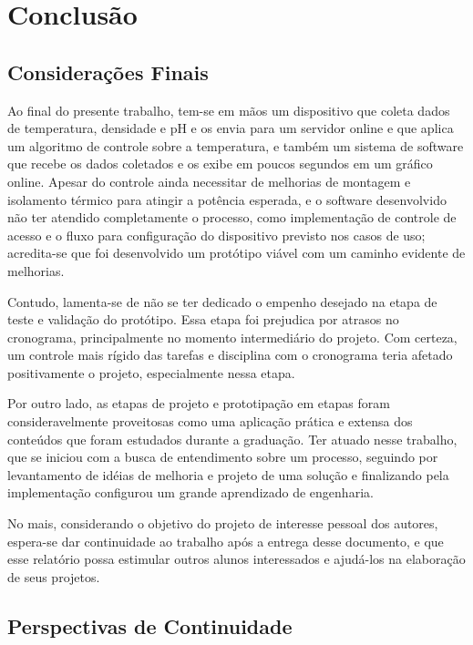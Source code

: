\chapter{Conclusão}

\section{Considerações Finais}

Ao final do presente trabalho, tem-se em mãos um dispositivo que coleta dados de temperatura, densidade e pH e os envia 
para um servidor online e que aplica um algoritmo de controle sobre a temperatura, e também um sistema de software 
que recebe os dados coletados e os exibe em poucos segundos em um gráfico online. 
Apesar do controle ainda necessitar de melhorias de montagem e isolamento térmico para atingir a potência esperada, e o 
software desenvolvido não ter atendido completamente o processo, como implementação de controle de acesso e o fluxo para 
configuração do dispositivo previsto nos casos de uso; acredita-se que foi desenvolvido um protótipo viável com um caminho evidente de melhorias.

Contudo, lamenta-se de não se ter dedicado o empenho desejado na etapa de teste e validação do protótipo. Essa etapa
foi prejudica por atrasos no cronograma, principalmente no momento intermediário do projeto. Com certeza, um controle mais rígido
das tarefas e disciplina com o cronograma teria afetado positivamente o projeto, especialmente nessa etapa.

Por outro lado, as etapas de projeto e prototipação em etapas foram consideravelmente proveitosas como uma aplicação
prática e extensa dos conteúdos que foram estudados durante a graduação. Ter atuado nesse trabalho, que se iniciou com
a busca de entendimento sobre um processo, seguindo por levantamento de idéias de melhoria e projeto de uma solução e 
finalizando pela implementação configurou um grande aprendizado de engenharia.

No mais, considerando o objetivo do projeto de interesse pessoal dos autores, espera-se dar continuidade ao trabalho após
a entrega desse documento, e que esse relatório possa estimular outros alunos interessados e ajudá-los na 
elaboração de seus projetos.

\section{Perspectivas de Continuidade}

